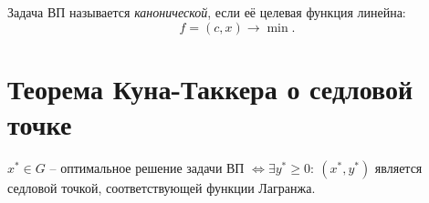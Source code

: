\begin{definition}
	Задача ВП называется \emph{канонической}, если её целевая функция линейна:
	\[
		f = (c,x) \rightarrow \min.
	\]
\end{definition}

\section{Теорема Куна-Таккера о седловой точке}

\begin{theorem}
	$x^* \in G$ -- оптимальное решение задачи ВП $\iff \exists y^* \geqslant 0: \ (x^*,y^*)$ является седловой точкой, соответствующей функции Лагранжа.
\end{theorem}
